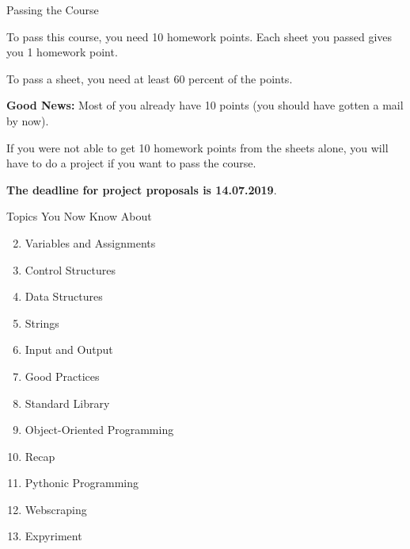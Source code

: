 \begin{frame}[fragile]{Passing the Course}

    To pass this course, you need 10 homework points. Each sheet you passed gives you 1 homework point.

    \vspace{1em}

    To pass a sheet, you need at least 60 percent of the points.

    \vspace{1em}

    \textbf{Good News:} Most of you already have 10 points (you should have gotten a mail by now).

    \vspace{1em}

    If you were not able to get 10 homework points from the sheets alone, you will have to do a project if you want to pass the course.

    \vspace{1em}

    \textbf{The deadline for project proposals is 14.07.2019}.



\end{frame}


\begin{frame}[fragile]{Topics You Now Know About}

    \begin{enumerate}

        \setcounter{enumi}{1}
        \item Variables and Assignments
        \item Control Structures
        \item Data Structures
        \item Strings
        \item Input and Output
        \item Good Practices
        \item Standard Library
        \item Object-Oriented Programming
        \item Recap
        \item Pythonic Programming
        \item Webscraping
        \item Expyriment

    \end{enumerate}

\end{frame}


